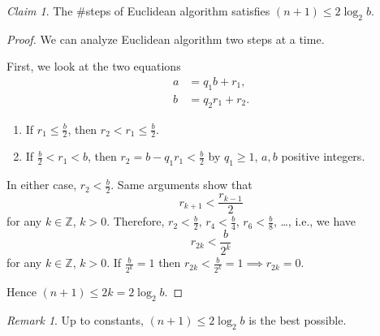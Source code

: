 \documentclass{amsbook}
\theoremstyle{plain}
\theoremstyle{definition}
\theoremstyle{remark}
\newtheorem{remark}[theorem]{Remark}
\newtheorem{claim}[theorem]{Claim}
\numberwithin{equation}{chapter}
\numberwithin{figure}{chapter}
\newcommand{\Z}{\mathbb{Z}}
\begin{document}
\begin{claim}\label{clm:euclidean_alg_steps}
The \#steps of Euclidean algorithm satisfies $(n+1) \leqslant 2\log_2 b$.
\end{claim}
\begin{proof}
We can analyze Euclidean algorithm two steps at a time. 

First, we look at the two equations
\begin{align}
a &= q_1 b + r_1, \\
b &= q_2 r_1 + r_2. 
\end{align}
\begin{enumerate}[label=(\roman*)]
\item If $r_1 \leqslant \frac{b}2$, then $r_2 < r_1 \leqslant \frac{b}2$.
\item If $\frac{b}2 < r_1 < b$, then $r_2 = b - q_1 r_1 < \frac{b}2$ by $q_1 \geqslant 1$, $a, b$ positive integers.
\end{enumerate}
In either case, $r_2 < \frac{b}2$. Same arguments show that 
\[
r_{k+1} < \frac{r_{k-1}}2 
\]
for any $k \in \Z$, $k > 0$.
Therefore, $r_2 < \frac{b}2$, $r_4 < \frac{b}4$, $r_6 < \frac{b}8$, \ldots, i.e., we have
\[
r_{2k} < \frac{b}{2^k}
\]
for any $k \in \Z$, $k > 0$. If $\frac{b}{2^k} = 1$ then $r_{2k} < \frac{b}{2^k} = 1 \implies r_{2k} = 0$.

Hence $(n+1) \leqslant 2k = 2\log_2 b$.
\end{proof}
\begin{remark}
Up to constants, $(n+1) \leqslant 2\log_2 b$ is the best possible.
\end{remark}
\end{document}
